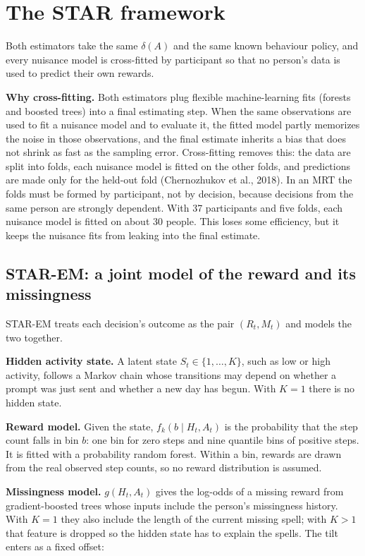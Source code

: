 \documentclass[12pt]{article}
\begin{document}
\section{The STAR framework}

Both estimators take the same $\delta(A)$ and the same known behaviour policy, and every nuisance model is cross-fitted by participant so that no person's data is used to predict their own rewards.

\textbf{Why cross-fitting.} Both estimators plug flexible machine-learning fits (forests and boosted trees) into a final estimating step. When the same observations are used to fit a nuisance model and to evaluate it, the fitted model partly memorizes the noise in those observations, and the final estimate inherits a bias that does not shrink as fast as the sampling error. Cross-fitting removes this: the data are split into folds, each nuisance model is fitted on the other folds, and predictions are made only for the held-out fold (Chernozhukov et al., 2018). In an MRT the folds must be formed by participant, not by decision, because decisions from the same person are strongly dependent. With 37 participants and five folds, each nuisance model is fitted on about 30 people. This loses some efficiency, but it keeps the nuisance fits from leaking into the final estimate.

\subsection{STAR-EM: a joint model of the reward and its missingness}

STAR-EM treats each decision's outcome as the pair $(R_t,M_t)$ and models the two together.

\textbf{Hidden activity state.} A latent state $S_t\in\{1,\dots,K\}$, such as low or high activity, follows a Markov chain whose transitions may depend on whether a prompt was just sent and whether a new day has begun. With $K=1$ there is no hidden state.

\textbf{Reward model.} Given the state, $f_k(b\mid H_t,A_t)$ is the probability that the step count falls in bin $b$: one bin for zero steps and nine quantile bins of positive steps. It is fitted with a probability random forest. Within a bin, rewards are drawn from the real observed step counts, so no reward distribution is assumed.

\textbf{Missingness model.} $g(H_t,A_t)$ gives the log-odds of a missing reward from gradient-boosted trees whose inputs include the person's missingness history. With $K=1$ they also include the length of the current missing spell; with $K>1$ that feature is dropped so the hidden state has to explain the spells. The tilt enters as a fixed offset:
\end{document}

